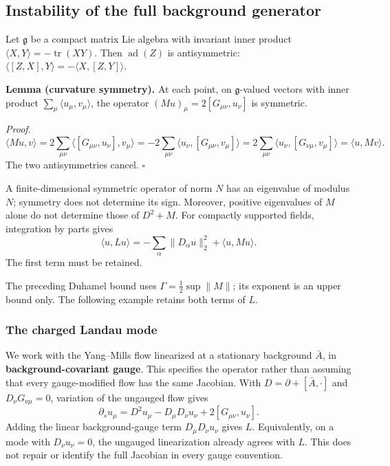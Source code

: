 \documentclass[11pt,a4paper]{article}
\begin{document}
\hypertarget{instability-of-the-full-background-generator}{%
\subsection{Instability of the full background
generator}\label{instability-of-the-full-background-generator}}

Let \(\mathfrak g\) be a compact matrix Lie algebra with invariant inner
product \(\langle X,Y\rangle=-\operatorname{tr}(XY)\). Then
\(\operatorname{ad}(Z)\) is antisymmetric:
\(\langle[Z,X],Y\rangle=-\langle X,[Z,Y]\rangle\).

\textbf{Lemma (curvature symmetry).} At each point, on
\(\mathfrak g\)-valued vectors with inner product
\(\sum_\mu\langle u_\mu,v_\mu\rangle\), the operator
\((Mu)_\mu=2[G_{\mu\nu},u_\nu]\) is symmetric.

\emph{Proof.} \[\langle Mu,v\rangle
=2\sum_{\mu\nu}\langle[G_{\mu\nu},u_\nu],v_\mu\rangle
=-2\sum_{\mu\nu}\langle u_\nu,[G_{\mu\nu},v_\mu]\rangle
=2\sum_{\mu\nu}\langle u_\nu,[G_{\nu\mu},v_\mu]\rangle
=\langle u,Mv\rangle.\] The two antisymmetries cancel. \(\square\)

A finite-dimensional symmetric operator of norm \(N\) has an eigenvalue
of modulus \(N\); symmetry does not determine its sign. Moreover,
positive eigenvalues of \(M\) alone do not determine those of \(D^2+M\).
For compactly supported fields, integration by parts gives
\[\langle u,Lu\rangle=-\sum_\alpha\|D_\alpha u\|_2^2
+\langle u,Mu\rangle.\] The first term must be retained.

The preceding Duhamel bound uses \(\Gamma=\frac12\sup\|M\|\); its
exponent is an upper bound only. The following example retains both
terms of \(L\).

\hypertarget{the-charged-landau-mode}{%
\subsubsection{The charged Landau mode}\label{the-charged-landau-mode}}

We work with the Yang--Mills flow linearized at a stationary background
\(\bar A\), in \textbf{background-covariant gauge}. This specifies the
operator rather than assuming that every gauge-modified flow has the
same Jacobian. With \(D=\partial+[\bar A,\cdot]\) and
\(D_\nu G_{\nu\mu}=0\), variation of the ungauged flow gives
\[\partial_su_\mu=D^2u_\mu-D_\mu D_\nu u_\nu
+2[G_{\mu\nu},u_\nu].\] Adding the linear background-gauge term
\(D_\mu D_\nu u_\nu\) gives \(L\). Equivalently, on a mode with
\(D_\nu u_\nu=0\), the ungauged linearization already agrees with \(L\).
This does not repair or identify the full Jacobian in every gauge
convention.
\end{document}

